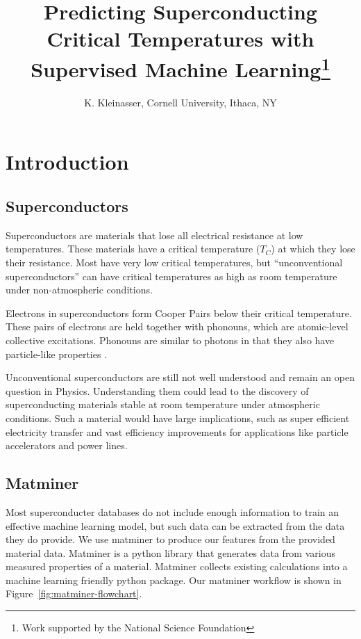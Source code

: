 \documentclass[twocolumn, nofootinbib, secnumarabic, amssymb, nobibnotes, aps, prd]{revtex4-2}
\begin{document}
\title{Predicting Superconducting Critical Temperatures with Supervised Machine Learning\thanks{Work supported by the National Science Foundation}}

\author{K. Kleinasser, Cornell University, Ithaca, NY}

\maketitle
\tableofcontents

\section{Introduction}
\subsection{Superconductors}
Superconductors are materials that lose all electrical resistance at low temperatures. These materials have a critical temperature ($T_C$) at which they lose their resistance. Most have very low critical temperatures, but “unconventional superconductors” can have critical temperatures as high as room temperature under non-atmospheric conditions. 

Electrons in superconductors form Cooper Pairs below their critical temperature. These pairs of electrons are held together with phonouns, which are atomic-level collective excitations. Phonouns are similar to photons in that they also have particle-like properties \cite{rohlf_1994}.

Unconventional superconductors are still not well understood and remain an open question in Physics. Understanding them could lead to the discovery of superconducting materials stable at room temperature under atmospheric conditions. Such a material would have large implications, such as super efficient electricity transfer and vast efficiency improvements for applications like particle accelerators and power lines.


\subsection{Matminer}
Most superconducter databases do not include enough information to train an effective machine learning model, but such data can be extracted from the data they do provide. We use matminer to produce our features from the provided material data. Matminer is a python library that generates data from various measured properties of a material. Matminer collects existing calculations into a machine learning friendly python package. Our matminer workflow is shown in Figure~\ref{fig:matminer-flowchart}.
\end{document}
